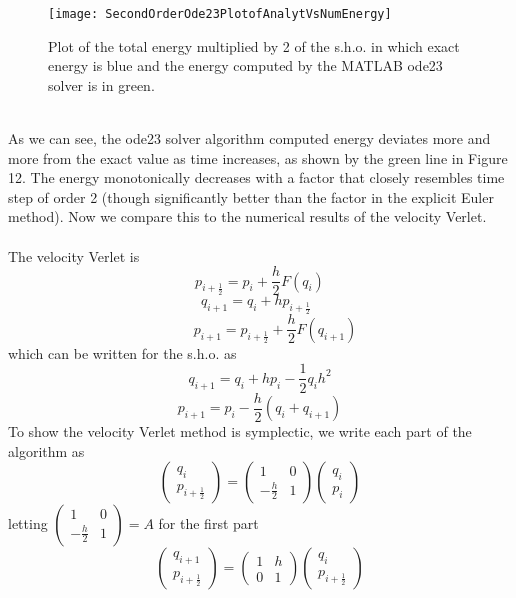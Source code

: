 \documentclass[12pt]{article}
\begin{document}
\begin{figure}[h!]
\centering
\texttt{[image: SecondOrderOde23PlotofAnalytVsNumEnergy]}
\caption{Plot of the total energy multiplied by 2 of the s.h.o. in which exact energy is blue and the energy computed by the MATLAB ode23 solver is in green.}
\end{figure}
\\\indent As we can see, the ode23 solver algorithm computed energy deviates more and more from the exact value as time increases, as shown by the green line in Figure 12. The energy monotonically decreases with a factor that closely resembles time step of order 2 (though significantly better than the factor in the explicit Euler method). Now we compare this to the numerical results of the velocity Verlet.\\
\\\indent The velocity Verlet is
\[p_{i+\frac{1}{2}}=p_i+\frac{h}{2}F(q_i)\]
\[q_{i+1}=q_i+hp_{i+\frac{1}{2}}\;\;\]
\[\;\;\;\;\;\;\;\;p_{i+1}=p_{i+\frac{1}{2}}+\frac{h}{2}F(q_{i+1})\]
which can be written for the s.h.o. as
\[q_{i+1}=q_i+hp_i-\frac{1}{2}q_ih^{2}\]
\[p_{i+1}=p_i-\frac{h}{2}(q_i+q_{i+1})\]
To show the velocity Verlet method is symplectic, we write each part of the algorithm as
\[\left (\begin{matrix}
  q_{i}  \\
  p_{i+\frac{1}{2}} 
 \end{matrix}\right)=
\left(\begin{matrix}
  1 & 0 \\
  -\frac{h}{2} & 1 
 \end{matrix}\right)
\left(\begin{matrix}
  q_i  \\
  p_i 
 \end{matrix}\right)\]
letting $\left(\begin{matrix} 1 & 0 \\ -\frac{h}{2} & 1 \end{matrix}\right)=A$ for the first part
\[\left (\begin{matrix}
  q_{i+1}  \\
  p_{i+\frac{1}{2}} 
 \end{matrix}\right)=
\left(\begin{matrix}
  1 & h \\
  0 & 1 
 \end{matrix}\right)
\left(\begin{matrix}
  q_i  \\
  p_{i+\frac{1}{2}} 
 \end{matrix}\right)\]
\end{document}
